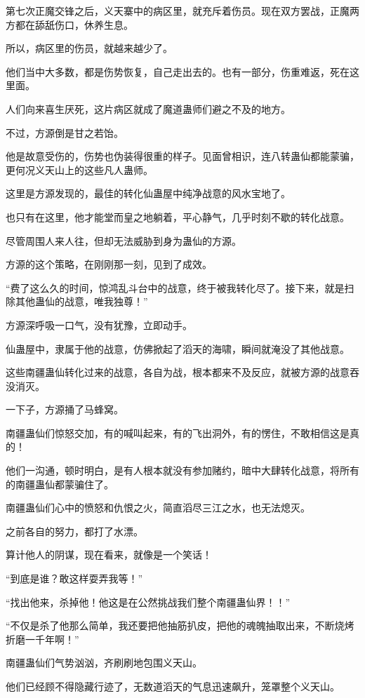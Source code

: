 \begin{this_body}
第七次正魔交锋之后，义天寨中的病区里，就充斥着伤员。现在双方罢战，正魔两方都在舔舐伤口，休养生息。

所以，病区里的伤员，就越来越少了。

他们当中大多数，都是伤势恢复，自己走出去的。也有一部分，伤重难返，死在这里面。

人们向来喜生厌死，这片病区就成了魔道蛊师们避之不及的地方。

不过，方源倒是甘之若饴。

他是故意受伤的，伤势也伪装得很重的样子。见面曾相识，连八转蛊仙都能蒙骗，更何况义天山上的这些凡人蛊师。

这里是方源发现的，最佳的转化仙蛊屋中纯净战意的风水宝地了。

也只有在这里，他才能堂而皇之地躺着，平心静气，几乎时刻不歇的转化战意。

尽管周围人来人往，但却无法威胁到身为蛊仙的方源。

方源的这个策略，在刚刚那一刻，见到了成效。

“费了这么久的时间，惊鸿乱斗台中的战意，终于被我转化尽了。接下来，就是扫除其他蛊仙的战意，唯我独尊！”

方源深呼吸一口气，没有犹豫，立即动手。

仙蛊屋中，隶属于他的战意，仿佛掀起了滔天的海啸，瞬间就淹没了其他战意。

这些南疆蛊仙转化过来的战意，各自为战，根本都来不及反应，就被方源的战意吞没消灭。

一下子，方源捅了马蜂窝。

南疆蛊仙们惊怒交加，有的喊叫起来，有的飞出洞外，有的愣住，不敢相信这是真的！

他们一沟通，顿时明白，是有人根本就没有参加赌约，暗中大肆转化战意，将所有的南疆蛊仙都蒙骗住了。

南疆蛊仙们心中的愤怒和仇恨之火，简直滔尽三江之水，也无法熄灭。

之前各自的努力，都打了水漂。

算计他人的阴谋，现在看来，就像是一个笑话！

“到底是谁？敢这样耍弄我等！”

“找出他来，杀掉他！他这是在公然挑战我们整个南疆蛊仙界！！”

“不仅是杀了他那么简单，我还要把他抽筋扒皮，把他的魂魄抽取出来，不断烧烤折磨一千年啊！”

南疆蛊仙们气势汹汹，齐刷刷地包围义天山。

他们已经顾不得隐藏行迹了，无数道滔天的气息迅速飙升，笼罩整个义天山。


\end{this_body}
